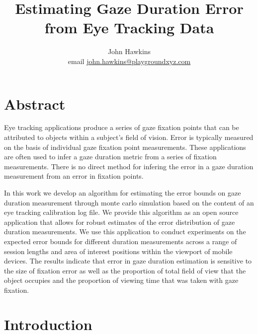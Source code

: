 \documentclass[12pt,a4paper]{article}
\numberwithin{equation}{section}
\begin{document}
 
\title{Estimating Gaze Duration Error from Eye Tracking Data}

\author{
John Hawkins \\ email \href{mailto:john.hawkins@playgroundxyz.com}{john.hawkins@playgroundxyz.com} \\
} 

\maketitle

\section{Abstract}

Eye tracking applications produce a series of gaze fixation points that can be attributed to
objects within a subject's field of vision. Error is typically measured on the basis of individual
gaze fixation point measurements. These applications are often used to infer a gaze duration
metric from a series of fixation measurements. There is no direct method for infering the error in
a gaze duration measurement from an error in fixation points. 

In this work we develop an algorithm for estimating
the error bounds on gaze duration measurement through monte carlo simulation based on the content
of an eye tracking calibration log file. We provide this algorithm as an open source application
that allows for robust estimates of the error distribution of gaze duration measurements. 
We use this application to conduct experiments on the expected error bounds for different duration
measurements across a range of session lengths and area of interest positions within the viewport
of mobile devices. The results indicate that error in gaze duration estimation is sensitive to
the size of fixation error as well as the proportion of total field of view that the object occupies
and the proportion of viewing time that was taken with gaze fixation.


\section{Introduction}
\end{document}
